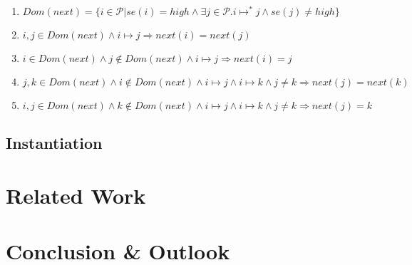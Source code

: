 \documentclass[a4paper,10pt]{llncs}
\begin{document}
\begin{enumerate}
\item $Dom(next) = \{i \in \mathcal{P} | se(i) = high \land \exists j \in \mathcal{P} . i \mapsto^* j \land se(j) \neq high\}$ 
\item $i, j \in Dom(next) \land i \mapsto j \Rightarrow next(i) = next(j)$
\item $i \in Dom(next) \land j \not\in Dom(next) \land i \mapsto j \Rightarrow next(i) = j$
\item $j, k \in Dom(next) \land i \not\in Dom(next) \land i \mapsto j \land i \mapsto k \land j \neq k \Rightarrow next(j) = next(k)$ 
\item $i, j \in Dom(next) \land k \not\in Dom(next) \land i \mapsto j \land i \mapsto k \land j \neq k \Rightarrow next(j) = k$
\end{enumerate}

\subsection{Instantiation}
\label{sec:instantiation}

\section{Related Work}
\label{sec:relatedwork}
\section{Conclusion \& Outlook}
\label{sec:conclusion}


\end{document}
